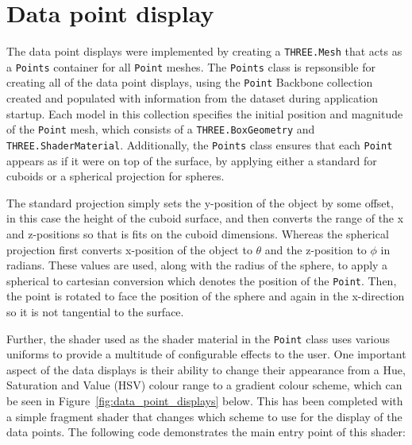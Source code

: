 \section{Data point display} {
\label{sec:data_point_display}

	The data point displays were implemented by creating a \texttt{THREE.Mesh} that acts as a \texttt{Points} container for all \texttt{Point} meshes. The \texttt{Points} class is repsonsible for creating all of the data point displays, using the \texttt{Point} Backbone collection created and populated with information from the dataset during application startup. Each model in this collection specifies the initial position and magnitude of the \texttt{Point} mesh, which consists of a \texttt{THREE.BoxGeometry} and \texttt{THREE.ShaderMaterial}. Additionally, the \texttt{Points} class ensures that each \texttt{Point} appears as if it were on top of the surface, by applying either a standard for cuboids or a spherical projection for spheres.

	The standard projection simply sets the y-position of the object by some offset, in this case the height of the cuboid surface, and then converts the range of the x and z-positions so that is fits on the cuboid dimensions. Whereas the spherical projection first converts x-position of the object to $\theta$ and the z-position to $\phi$ in radians. These values are used, along with the radius of the sphere, to apply a spherical to cartesian conversion which denotes the position of the \texttt{Point}. Then, the point is rotated to face the position of the sphere and again in the x-direction so it is not tangential to the surface.

	Further, the shader used as the shader material in the \texttt{Point} class uses various uniforms to provide a multitude of configurable effects to the user. One important aspect of the data displays is their ability to change their appearance from a Hue, Saturation and Value (HSV) colour range to a gradient colour scheme, which can be seen in Figure~\ref{fig:data_point_displays} below. This has been completed with a simple fragment shader that changes which scheme to use for the display of the data points. The following code demonstrates the main entry point of this shader:

	

	

}

